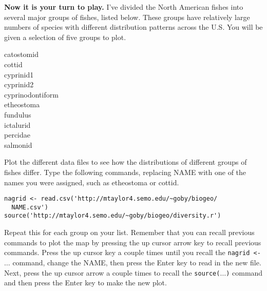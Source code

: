 \documentclass[11pt]{article}
\begin{document}
\textbf{Now it is your turn to play.} I've divided the North American
fishes into several major groups of fishes, listed below. These groups
have relatively large numbers of species with different distribution
patterns across the U.S. You will be given a selection of five
groups to plot.

\begin{multicols}{2}
catostomid \\
cottid \\
cyprinid1 \\
cyprinid2 \\
cyprinodontiform \\
etheostoma \\
fundulus \\
ictalurid \\
percidae \\
salmonid
\end{multicols}


Plot the different data files to see how the
distributions of different groups of fishes differ. Type the following
commands, replacing NAME with one of the names you were assigned, such as
etheostoma or cottid.

\begin{verbatim}
nagrid <- read.csv('http://mtaylor4.semo.edu/~goby/biogeo/
  NAME.csv')
source('http://mtaylor4.semo.edu/~goby/biogeo/diversity.r')
\end{verbatim}

Repeat this for each group on your list. Remember that you can recall
previous commands to plot the map by pressing the up cursor
arrow key to recall previous commands. Press the up cursor key a couple 
times until you recall the \texttt{nagrid \textless{}- $\ldots$} command, change the NAME,
then press the Enter key to read in the new file. Next, press the up cursor
arrow a couple times to recall the \texttt{source($\ldots$)} command and then
press the Enter key to make the new plot.
\end{document}
